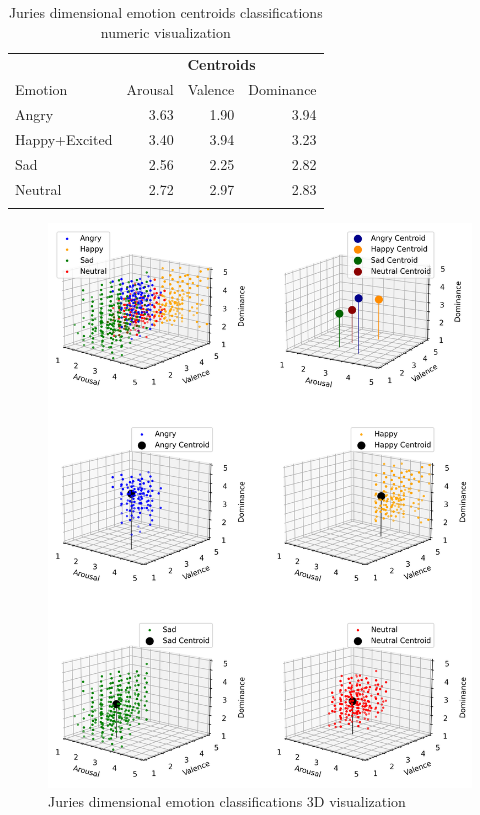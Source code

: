 \begin{table}[H]
\small
\caption{Juries dimensional emotion centroids classifications numeric visualization}
\label{tab:dominance}
\centering
    \begin{tabular}{lrrr}
        \toprule
        {} & \multicolumn{3}{c}{\textbf{Centroids}} \\ \cmidrule{2-4}
        Emotion &    Arousal &      Valence &       Dominance \\
        \midrule
        Angry   &    3.63 &  1.90 &  3.94 \\         \addlinespace
        Happy+Excited &  3.40 & 3.94 & 3.23 \\   \addlinespace
        Sad    &   2.56 & 2.25 & 2.82\\         \addlinespace
        Neutral  &  2.72 & 2.97 & 2.83\\         \addlinespace
        \bottomrule
    \end{tabular}
\end{table}


\begin{figure}[H]
  \centering
  \includegraphics[width=.9\linewidth]{figs/5_data_stratification/primitives_visualization.png}
  \caption{Juries dimensional emotion classifications 3D visualization}
  \label{fig:signalWP}
\end{figure}

